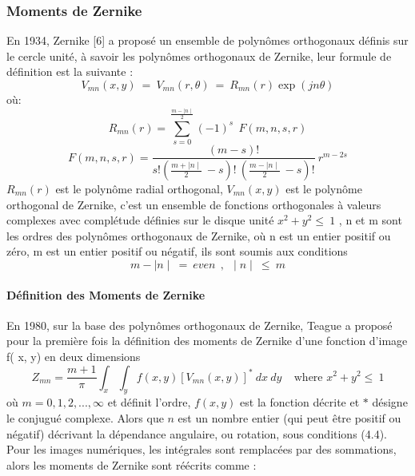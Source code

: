 \subsubsection{Moments de Zernike}
En 1934, Zernike [6] a proposé un ensemble de polynômes orthogonaux définis sur le cercle unité, à savoir les polynômes orthogonaux de Zernike, leur formule de définition est la suivante :
\begin{equation}
V_{mn}(x, y)~=~V_{mn}(r,\theta)~=~R_{mn}(r)\exp(jn\theta)
\end{equation}
où:
\begin{displaymath}
R_{mn}(r) = \sum_{s=0}^{\frac{m-\mid n \mid}{2}}(-1)^{s}~~F(m,n,s,r)
\end{displaymath}
\begin{displaymath}
F(m,n,s,r) = \frac{(m-s)!}{s!(\frac{m+\mid n \mid}{2}~-s)!~(\frac{m-\mid n \mid}{2}~-s)! }~r^{m-2s}
\end{displaymath}
$ R_{mn}(r) $  est le polynôme radial orthogonal, $ V_{mn}(x, y) $ est le polynôme orthogonal de Zernike, c'est un ensemble de fonctions orthogonales à valeurs complexes avec complétude définies sur le disque unité $x^{2} + y^{2} \leq ~1$ , n et m sont les ordres des polynômes orthogonaux de Zernike, où n est un entier positif ou zéro, m est un entier positif ou négatif, ils sont soumis aux conditions 
\begin{equation}
m- \mid n \mid ~=~even~~,~~\mid n \mid~\leq~m
\end{equation}

\paragraph{Définition des Moments de Zernike}
En 1980, sur la base des polynômes orthogonaux de Zernike, Teague a proposé pour la première fois la définition des moments de Zernike d'une fonction d'image f( x, y) en deux dimensions
\begin{displaymath}
Z_{mn} = \frac{m+1}{\pi} \int_{x} \int_{y} f(x,y)[V_{mn}(x,y)]^{*} ~dx~dy~~~~~\mbox{where $x^{2} + y^{2} \leq ~1$}
\end{displaymath}
où $m = 0,1,2,...,\infty$ et définit l'ordre, $f(x,y)$ est la fonction décrite et $*$ désigne le conjugué complexe. Alors que $n$ est un nombre entier (qui peut être positif ou négatif) décrivant la dépendance angulaire, ou rotation, sous conditions (4.4). Pour les images numériques, les intégrales sont remplacées par des sommations, alors les moments de Zernike sont réécrits comme :

